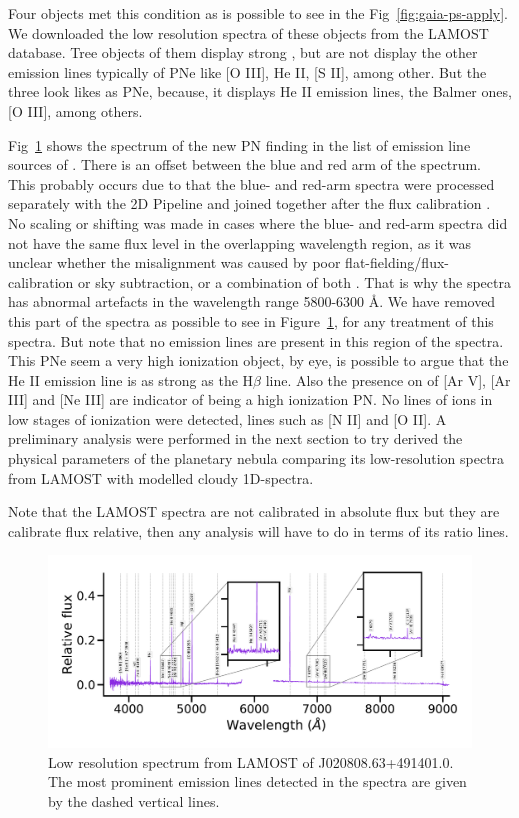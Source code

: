 \documentclass[fleqn,usenatbib]{mnras}
\begin{document}
Four objects met this  condition as is possible to see in the Fig~\ref{fig:gaia-ps-apply}.
We downloaded the low resolution spectra of these objects from the LAMOST database. 
Tree objects of them display strong \ha{}, but are not display the other emission
lines typically of PNe like [O III], He II, [S II], among other. But the three look likes as PNe,
because, it displays He II emission lines, the Balmer ones, [O III], among others.

Fig~\ref{fig:spectra} shows the spectrum of the new PN finding in the list of emission
line sources of \citet{Skoda:2020}. There is an offset between the blue and red arm of
the spectrum. This probably occurs due to that the blue- and red-arm spectra were
processed separately with the 2D Pipeline and joined together after the ﬂux calibration
\citep{Xiang:2015}. No scaling or shifting was made in cases where the blue- and
red-arm spectra did not have the same ﬂux level in the overlapping wavelength region,
as it was unclear whether the misalignment was caused by poor ﬂat-ﬁelding/flux-calibration
or sky subtraction, or a combination of both \citep{Chen:2016}. That is why the spectra has
abnormal artefacts in the wavelength range 5800-6300 \AA. We have removed this part of
the spectra as possible to see in Figure~\ref{fig:spectra}, for any treatment of
this spectra. But note that no emission lines are present in this region of the spectra.
This PNe seem a very high ionization object, by eye, is possible to argue
that the He II emission line is as strong as the H$\beta$ line.
Also the presence on of [Ar V], [Ar III] and [Ne III] are indicator of being a high
ionization PN. No lines of ions in low stages of ionization were detected,
lines such as [N II] and [O II]. A preliminary analysis were performed in the next
section to try derived the physical parameters of the planetary nebula comparing
its low-resolution spectra from LAMOST with modelled {\sc cloudy} 1D-spectra.

Note that the LAMOST spectra are not calibrated in absolute flux but they are
calibrate flux relative, then any analysis will have to do in terms of its ratio lines. 

\begin{figure}
\centering
  \includegraphics[width=\linewidth]{Figs/spec-56581-VB031N50V1_sp08-218.pdf}
  \caption{Low resolution spectrum from LAMOST of J020808.63+491401.0.
    The most prominent emission lines detected in the spectra are given by the dashed vertical
    lines.} 
  \label{fig:spectra}
\end{figure}
\end{document}
